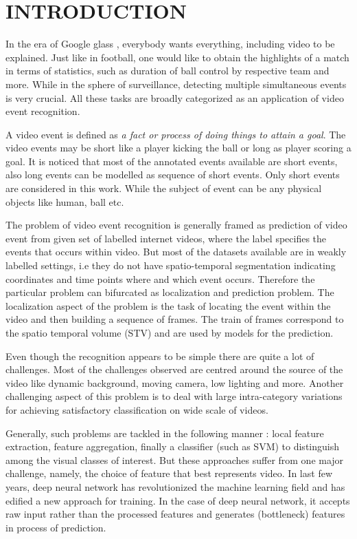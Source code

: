 \chapter{INTRODUCTION}
\label{chap:intro}
In the era of Google glass \citep{googleGlass}, %
everybody wants everything, including video to be explained.  Just like in football, one would like to obtain the highlights of a match in terms of statistics, such as duration of ball control by respective team and more.  While in the sphere of surveillance, detecting multiple simultaneous events is very crucial.  All these tasks are broadly categorized as an application of video event recognition. 

\par A video event is defined as \textit{a fact or process of doing things to attain a goal}.  The video events may be short like a player kicking the ball or long as player scoring a goal.  It is noticed that most of the annotated events available are short events, also long events can be modelled as sequence of short events.  Only short events are considered in this work.  While the subject of event can be any physical objects like human, ball etc.
\par The problem of video event recognition is generally framed as prediction of video event from given set of labelled internet videos, where the label specifies the events that occurs within video.  But most of the datasets available are in weakly labelled settings, i.e they do not have spatio-temporal segmentation indicating coordinates and time points where and which event occurs.  Therefore the particular problem can bifurcated as localization and prediction problem.  The localization aspect of the problem is the task of locating the event within the video %
and then building a sequence of frames.  The train of frames correspond to the spatio temporal volume (STV) and are used by models for the prediction.
\par Even though the recognition appears to be simple there are quite a lot of challenges.  Most of the challenges observed are centred around the source of the video like dynamic background, moving camera, low lighting and more.  Another challenging aspect of this problem is to deal with large intra-category variations for achieving satisfactory classification on wide scale of videos.
\par Generally, such problems are tackled in the following manner : local feature extraction, feature aggregation, finally a classifier (such as SVM) to distinguish among the visual classes of interest.  But these approaches suffer from one major challenge, namely, the choice of feature that best represents video.  In last few years, deep neural network has revolutionized the machine learning field and has edified a new approach for training.  In the case of deep neural network, it accepts raw input rather than the processed features and generates (bottleneck) features in process of prediction. 

